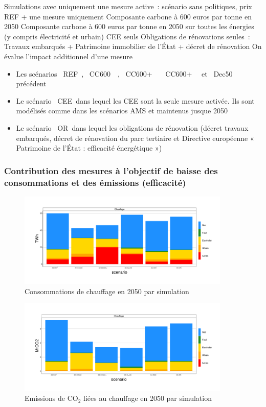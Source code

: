 \documentclass[10.5pt,a4paper]{article}
\begin{document}
{Simulations avec uniquement une mesure active : scénario sans politiques, prix REF + une mesure uniquement
Composante carbone à 600 euros par tonne en 2050
Composante carbone à 600 euros par tonne en 2050 sur toutes les énergies (y compris électricité et urbain) 
CEE seuls
Obligations de rénovations seules : Travaux embarqués + Patrimoine immobilier de l’État + décret de rénovation
On évalue l’impact additionnel d’une mesure

 
\begin{itemize}
	\item Les scénarios \og~REF~\fg, \og~CC600~\fg~, \og~CC600+~\fg~ \og~CC600+~\fg~ et \og~Dec50~\fg~ précédent
	\item Le scénario \og~CEE~\fg dans lequel les CEE sont la seule mesure activée. Ils sont modélisés comme dans les scénarios AMS et maintenus jusque 2050
	\item Le scénario \og~OR~\fg dans lequel les obligations de rénovation (décret travaux embarqués, décret de rénovation du parc tertiaire et Directive européenne « Patrimoine de l’État : efficacité énergétique »)
	
\end{itemize}

\subsubsection{Contribution des mesures à l'objectif de baisse des consommations et des émissions (efficacité)}


\begin{figure}[h!]
\centering 
\caption{Consommations de chauffage en 2050 par simulation}\label{comp_cible_AMS_energie_chauffage-1}  
\includegraphics[width = 0.9\textwidth]{comp_cible_AMS_energie_chauffage-1}  
\end{figure}

\begin{figure}[h!]
\centering 
\caption{Emissions de CO$_2$ liées au chauffage en 2050 par simulation}\label{Em_chauffage_2050-1}  
\includegraphics[width = 0.9\textwidth]{Em_chauffage_2050-1}  
\end{figure}

}
\end{document}
